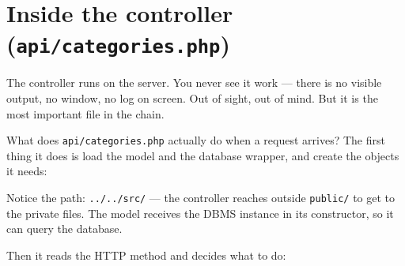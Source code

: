 \documentclass[11pt,a4paper,oneside]{book}
\newenvironment{Shaded}{\begin{snugshade}}{\end{snugshade}}
\newcommand{\KeywordTok}[1]{\textcolor[HTML]{007020}{\textbf{#1}}}
\newcommand{\ConstantTok}[1]{\textcolor[HTML]{880000}{#1}}
\newcommand{\StringTok}[1]{\textcolor[HTML]{4070A0}{#1}}
\newcommand{\OtherTok}[1]{\textcolor[HTML]{007020}{#1}}
\newcommand{\VariableTok}[1]{\textcolor[HTML]{19177C}{#1}}
\newcommand{\OperatorTok}[1]{\textcolor[HTML]{666666}{#1}}
\newcommand{\NormalTok}[1]{#1}
\begin{document}
\hypertarget{inside-the-controller-apicategories.php}{%
\section{\texorpdfstring{Inside the controller
(\texttt{api/categories.php})}{Inside the controller (api/categories.php)}}\label{inside-the-controller-apicategories.php}}

The controller runs on the server. You never see it work ---
there is no visible output, no window, no log on screen. Out of
sight, out of mind. But it is the most important file in the
chain.

What does \texttt{api/categories.php} actually do when a request
arrives? The first thing it does is load the model and the
database wrapper, and create the objects it needs:

\begin{Shaded}
\end{Shaded}

Notice the path: \texttt{../../src/} --- the controller reaches
outside \texttt{public/} to get to the private files. The model
receives the DBMS instance in its constructor, so it can query
the database.

Then it reads the HTTP method and decides what to do:
\end{document}
